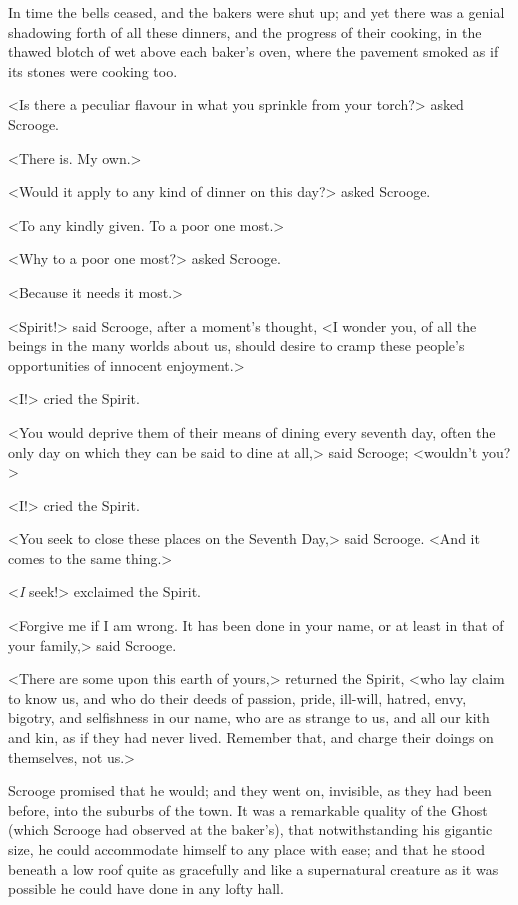 In time the bells ceased, and the bakers were shut up; and yet there was a genial shadowing forth of all these dinners, and the progress of their cooking, in the thawed blotch of wet above each baker's oven, where the pavement smoked as if its stones were cooking too.

<Is there a peculiar flavour in what you sprinkle from your torch?> asked Scrooge.

<There is. My own.>

<Would it apply to any kind of dinner on this day?> asked Scrooge.

<To any kindly given. To a poor one most.>

<Why to a poor one most?> asked Scrooge.

<Because it needs it most.>

<Spirit!> said Scrooge, after a moment's thought, <I wonder you, of all the beings in the many worlds about us, should desire to cramp these people's opportunities of innocent enjoyment.>

<I\@!> cried the Spirit.


<You would deprive them of their means of dining every seventh day, often the only day on which they can be said to dine at all,> said Scrooge; <wouldn't you?>

<I\@!> cried the Spirit.

<You seek to close these places on the Seventh Day,> said Scrooge. <And it comes to the same thing.>

<\textit{I} seek!> exclaimed the Spirit.

<Forgive me if I am wrong. It has been done in your name, or at least in that of your family,> said Scrooge.

<There are some upon this earth of yours,> returned the Spirit, <who lay claim to know us, and who do their deeds of passion, pride, ill-will, hatred, envy, bigotry, and selfishness in our name, who are as strange to us, and all our kith and kin, as if they had never lived. Remember that, and charge their doings on themselves, not us.>


Scrooge promised that he would; and they went on, invisible, as they had been before, into the suburbs of the town. It was a remarkable quality of the Ghost (which Scrooge had observed at the baker's), that notwithstanding his gigantic size, he could accommodate himself to any place with ease; and that he stood beneath a low roof quite as gracefully and like a supernatural creature as it was possible he could have done in any lofty hall.



